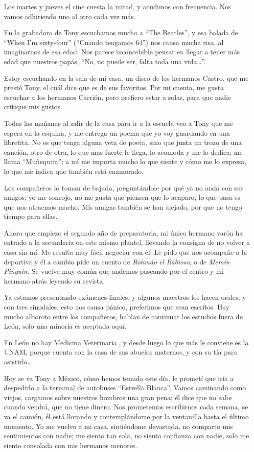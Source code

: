\documentclass[letterpaper, 12pt]{book}
\begin{document}
Los martes y jueves el cine cuesta la mitad, y acudimos con frecuencia. Nos vamos adhiriendo uno al otro cada vez más.

En la grabadora de Tony escuchamos mucho a ``The Beatles'', y esa balada de ``When I'm sixty-four'' (``Cuando tengamos 64'') nos causa mucha risa, al imaginarnos de esa edad. Nos parece inconcebible pensar en llegar a tener más edad que nuestros papás, ``No, no puede ser, falta toda una vida\ldots''.

Estoy escuchando en la sala de mi casa, un disco de los hermanos Castro, que me prestó Tony, el cuál dice que es de sus favoritos. Por mi cuenta, me gusta escuchar a los hermanos Carrión, pero prefiero estar a solas, para que nadie critique mis gustos.

Todas las mañanas al salir de la casa para ir a la escuela veo a Tony que me espera en la esquina, y me entrega un poema que yo voy guardando en una libretita. No es que tenga alguna veta de poeta, sino que junta un trozo de una canción, otro de otra, lo que mas fuerte le llega, lo acomoda y me lo dedica; me llama ``Muñequita''; a mí me importa mucho lo que siente y cómo me lo expresa, lo que me indica que también está enamorado.

Los compañeros lo toman de bajada, preguntándole por qué ya no anda con sus amigos; yo me sonrojo, no me gusta que piensen que lo acaparo, lo que pasa es que nos atraemos mucho. Mis amigas también se han alejado, por que no tengo tiempo para ellas. 

Ahora que empiezo el segundo año de preparatoria, mi único hermano varón ha entrado a la secundaria en este mismo plantel, llevando la consigna de no volver a casa sin mí. Me resulta muy fácil negociar con él: Le pido que nos acompañe a la deportiva y él a cambio pide un cuento de {\it Rolando el Rabioso}, o de {\it Memín Pinguín.} Se vuelve muy común que andemos paseando por el centro y mi hermano atrás leyendo su revista.


Ya estamos presentando exámenes finales, y algunos maestros los hacen orales, y con tres sinodales, esto nos causa pánico, preferimos que sean escritos. Hay mucho alboroto entre los compañeros, hablan de continuar los estudios fuera de León, solo una minoría es aceptada aquí.

En León no hay Medicina Veterinaria , y desde luego lo que más le conviene es la UNAM, porque cuenta con la casa de sus abuelos maternos, y con su tía para asistirlo\ldots

Hoy se va Tony a México, cómo hemos temido este día, le prometí que iría a despedirlo a la terminal de autobuses ``Estrella Blanca''. Vamos caminando como viejos, cargamos sobre nuestros hombros una gran pena; él dice que no sabe cuando vendrá, que no tiene dinero. Nos prometemos escribirnos cada semana, se va el camión, él está llorando y contemplándome por la ventanilla hasta el último momento. Yo me vuelvo a mi casa, sintiéndome devastada, no comparto mis sentimientos con nadie; me siento tan sola, no siento confianza con nadie, solo me siento consolada con mis hermanos menores. 
\end{document}
